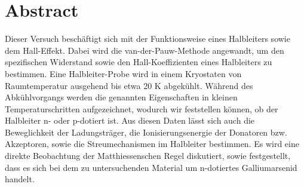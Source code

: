 \documentclass[11pt,a4paper]{scrartcl}
\begin{document}
%
\def\settitle{}


\section*{Abstract}
Dieser Versuch beschäftigt sich mit der Funktionsweise eines Halbleiters sowie dem Hall-Effekt. Dabei wird die van-der-Pauw-Methode angewandt, um den spezifischen Widerstand sowie den Hall-Koeffizienten eines Halbleiters zu bestimmen. Eine Halbleiter-Probe wird in einem Kryostaten von Raumtemperatur ausgehend bis etwa 20 K abgekühlt. Während des Abkühlvorgangs werden die genannten Eigenschaften in kleinen Temperaturschritten aufgezeichnet, wodurch wir feststellen können, ob der Halbleiter n- oder p-dotiert ist. Aus diesen Daten lässt sich auch die Beweglichkeit der Ladungsträger, die Ionisierungsenergie der Donatoren bzw. Akzeptoren, sowie die Streumechanismen im Halbleiter bestimmen. Es wird eine direkte Beobachtung der Matthiessenschen Regel diskutiert, sowie festgestellt, dass es sich bei dem zu untersuchenden Material um n-dotiertes Galliumarsenid handelt.
\vspace{1cm}
\newpage
%
%
\tableofcontents
\cleardoublepage
{} 
%
%
\setcounter{section}{-1}








 


\newpage

\printbibliography
\clearpage


\end{document}

